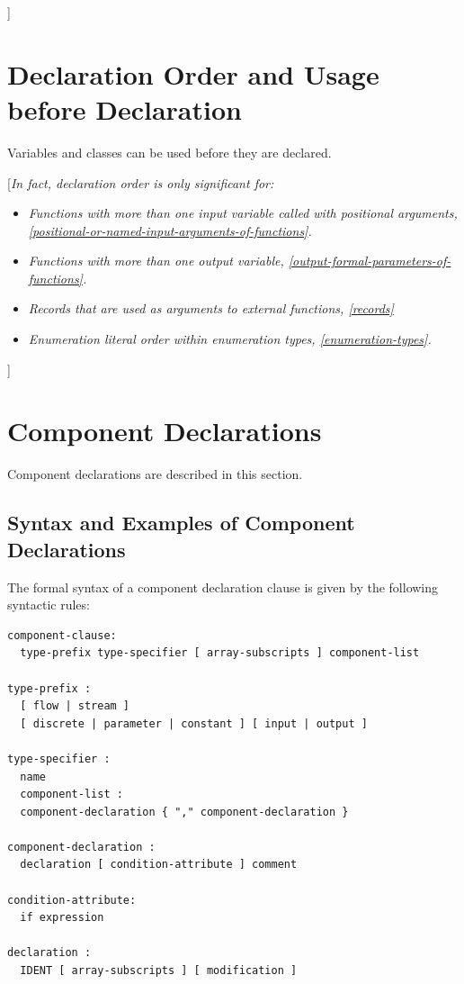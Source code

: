 \documentclass[10pt,a4paper]{report}
\def\doublelabel#1{\label{#1}}
\begin{document}
{]}

\section{Declaration Order and Usage before Declaration}\doublelabel{declaration-order-and-usage-before-declaration}

Variables and classes can be used before they are declared.

{[}\emph{In fact, declaration order is only significant for:}

\begin{itemize}
\item
  \emph{Functions with more than one input variable called with
  positional arguments, \ref{positional-or-named-input-arguments-of-functions}.}
\item
  \emph{Functions with more than one output variable, \ref{output-formal-parameters-of-functions}.}
\item
  \emph{Records that are used as arguments to external functions,
  \ref{records}}
\item
  \emph{Enumeration literal order within enumeration types, \ref{enumeration-types}.}
\end{itemize}

{]}

\section{Component Declarations}\doublelabel{component-declarations}

Component declarations are described in this section.

\subsection{Syntax and Examples of Component Declarations}\doublelabel{syntax-and-examples-of-component-declarations}

The formal syntax of a component declaration clause is given by the
following syntactic rules:

\begin{lstlisting}[language=grammar]
component-clause:
  type-prefix type-specifier [ array-subscripts ] component-list
  
type-prefix :
  [ flow | stream ]
  [ discrete | parameter | constant ] [ input | output ]
  
type-specifier :
  name
  component-list :
  component-declaration { "," component-declaration }
  
component-declaration :
  declaration [ condition-attribute ] comment
  
condition-attribute:
  if expression
  
declaration :
  IDENT [ array-subscripts ] [ modification ]
\end{lstlisting}
\end{document}
